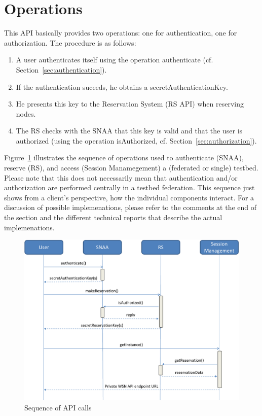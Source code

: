 \documentclass[a4paper,12pt]{article}
\begin{document}
\FloatBarrier
	\section{Operations}
	\label{sec:operations}
This API basically provides two operations: one for authentication, one for authorization. The procedure is as follows:

\begin{enumerate}
	\item A user authenticates itself using the operation authenticate (cf. Section~\ref{sec:authentication}).
	\item If the authentication suceeds, he obtains a secretAuthenticationKey.
	\item He presents this key to the Reservation System (RS API) when reserving nodes.
	\item The RS checks with the SNAA that this key is valid and that the user is authorized (using the operation isAuthorized, cf. Section~\ref{sec:authorization}).
\end{enumerate}

Figure~\ref{fig:api-sequence} illustrates the sequence of operations used to authenticate (SNAA), reserve (RS), and access (Session Manamegement) a (federated or single) testbed. Please note that this does not necessarily mean that authentication and/or authorization are performed centrally in a testbed federation. This sequence just shows from a client's perspective, how the individual components interact. For a discussion of possible implemenations, please refer to the comments at the end of the section and the different technical reports that describe the actual implemenations.

 \begin{figure}[htb]
      \begin{center}
      \includegraphics[width=.9\textwidth]{fig/api-sequence}
      \caption{Sequence of API calls}
      \label{fig:api-sequence}
      \end{center}
\end{figure}
\end{document}
